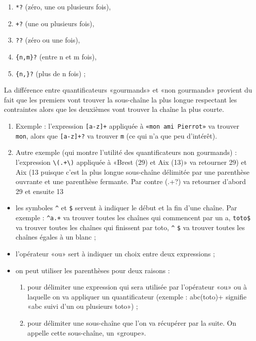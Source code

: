 \documentclass[11pt]{article}
\providecommand{\tightlist}{%
      \setlength{\itemsep}{0pt}\setlength{\parskip}{0pt}}
\begin{document}
\begin{itemize}
  \begin{enumerate}
  \def\labelenumi{\arabic{enumi}.}
  \tightlist
  \item
    \texttt{*?} (zéro, une ou plusieurs fois),
  \item
    \texttt{+?} (une ou plusieurs fois),
  \item
    \texttt{??} (zéro ou une fois),
  \item
    \texttt{\{n,m\}?} (entre n et m fois),
  \item
    \texttt{\{n,\}?} (plus de n fois) ;
  \end{enumerate}
\end{itemize}

    La différence entre quantificateurs «gourmands» et «non gourmands»
provient du fait que les premiers vont trouver la sous-chaîne la plus
longue respectant les contraintes alors que les deuxièmes vont trouver
la chaîne la plus courte.

\begin{enumerate}
\def\labelenumi{\arabic{enumi}.}
\item
  Exemple : l'expression \texttt{{[}a-z{]}+} appliquée à
  \texttt{«mon\ ami\ Pierrot»} va trouver \texttt{mon}, alors que
  \texttt{{[}a-z{]}+?} va trouver \texttt{m} (ce qui n'a que peu
  d'intérêt).
\item
  Autre exemple (qui montre l'utilité des quantificateurs non gourmands)
  : l'expression \texttt{\textbackslash{}(.+\textbackslash{})} appliquée
  à «Brest (29) et Aix (13)» va retourner 29) et Aix (13 puisque c'est
  la plus longue sous-chaîne délimitée par une parenthèse ouvrante et
  une parenthèse fermante. Par contre (.+?) va retourner d'abord 29 et
  ensuite 13
\end{enumerate}

    \begin{itemize}
\tightlist
\item
  les symboles \texttt{\^{}} et \texttt{\$} servent à indiquer le début
  et la fin d'une chaîne. Par exemple : \texttt{\^{}a.+} va trouver
  toutes les chaînes qui commencent par un a, \texttt{toto\$} va trouver
  toutes les chaînes qui finissent par toto, \texttt{\^{}} \texttt{\$}
  va trouver toutes les chaînes égales à un blanc ;
\item
  l'opérateur «ou» \texttt{\textbar{}} sert à indiquer un choix entre
  deux expressions ;
\item
  on peut utiliser les parenthèses pour deux raisons :

  \begin{enumerate}
  \def\labelenumi{\arabic{enumi}.}
  \tightlist
  \item
    pour délimiter une expression qui sera utilisée par l'opérateur «ou»
    ou à laquelle on va appliquer un quantificateur (exemple :
    abc(toto)+ signifie «abc suivi d'un ou plusieurs toto») ;
  \item
    pour délimiter une sous-chaîne que l'on va récupérer par la suite.
    On appelle cette sous-chaîne, un «groupe».
  \end{enumerate}
\end{itemize}
\end{document}
